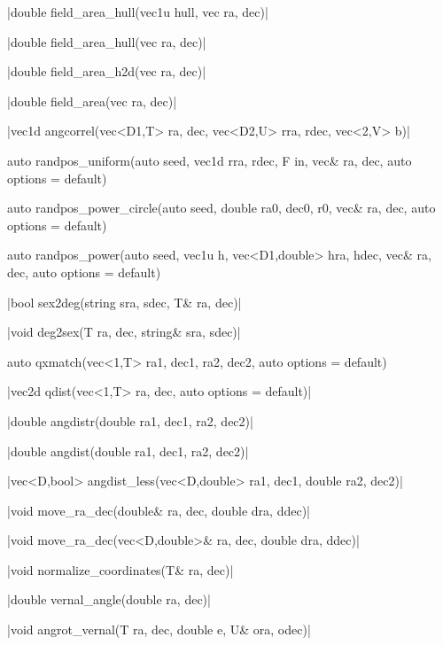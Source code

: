 \funcitem \cppinline|double field_area_hull(vec1u hull, vec ra, dec)| 

\cppinline|double field_area_hull(vec ra, dec)|

\funcitem \cppinline|double field_area_h2d(vec ra, dec)| 

\funcitem \cppinline|double field_area(vec ra, dec)| 

\funcitem \cppinline|vec1d angcorrel(vec<D1,T> ra, dec, vec<D2,U> rra, rdec, vec<2,V> b)| 

\funcitem {} \begin{cppcode}
auto randpos_uniform(auto seed, vec1d rra, rdec, F in,
                     vec& ra, dec, auto options = default)
\end{cppcode}

\funcitem {} \begin{cppcode}
auto randpos_power_circle(auto seed, double ra0, dec0, r0,
                          vec& ra, dec, auto options = default)
\end{cppcode}

\funcitem {} \begin{cppcode}
auto randpos_power(auto seed, vec1u h, vec<D1,double> hra, hdec,
                   vec& ra, dec, auto options = default)
\end{cppcode}

\funcitem \vectorfunc \cppinline|bool sex2deg(string sra, sdec, T& ra, dec)| 

\vectorfunc \cppinline|void deg2sex(T ra, dec, string& sra, sdec)| 

\funcitem {} \begin{cppcode}
auto qxmatch(vec<1,T> ra1, dec1, ra2, dec2,
             auto options = default)
\end{cppcode}

\funcitem \cppinline|vec2d qdist(vec<1,T> ra, dec, auto options = default)| 

\funcitem \vectorfunc \cppinline|double angdistr(double ra1, dec1, ra2, dec2)| 

\vectorfunc \cppinline|double angdist(double ra1, dec1, ra2, dec2)| 

\funcitem \cppinline|vec<D,bool> angdist_less(vec<D,double> ra1, dec1, double ra2, dec2)| 

\funcitem \cppinline|void move_ra_dec(double& ra, dec, double dra, ddec)| 

\cppinline|void move_ra_dec(vec<D,double>& ra, dec, double dra, ddec)|

\funcitem \cppinline|void normalize_coordinates(T& ra, dec)| 

\funcitem \cppinline|double vernal_angle(double ra, dec)| 

\funcitem \cppinline|void angrot_vernal(T ra, dec, double e, U& ora, odec)| 

